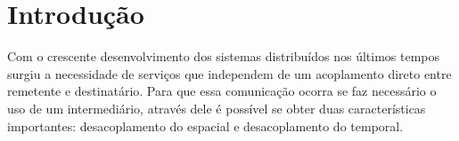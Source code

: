 \documentclass[
	12pt,				%
    oneside,			%
	a4paper,			%
	english,			%
	brazil,				%
	]{abntex2}
\begin{document}







\tableofcontents*


\textual

\chapter{Introdução} 

Com o crescente desenvolvimento dos sistemas distribuídos nos últimos tempos surgiu a necessidade de serviços que independem de um acoplamento direto entre remetente e destinatário. Para que essa comunicação ocorra se faz necessário o uso de um intermediário, através dele é possível se obter duas características importantes: desacoplamento do espacial e desacoplamento do temporal.
\end{document}
